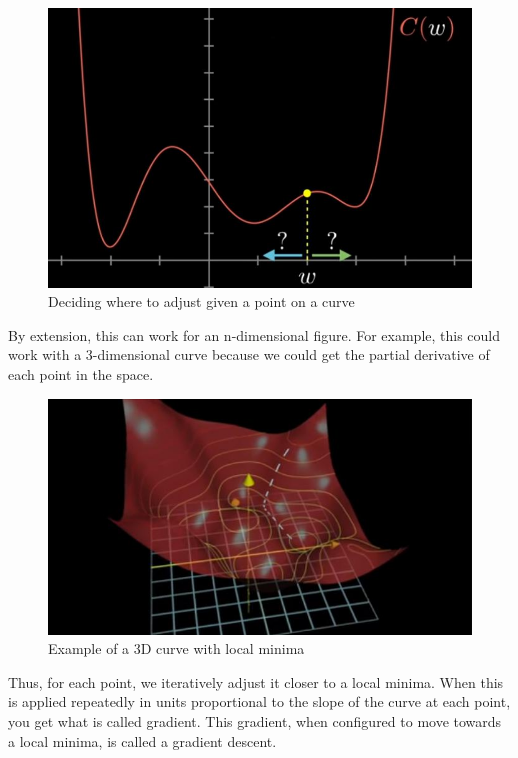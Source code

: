 \documentclass[a4paper, 11pt, english]{article}
\begin{document}
\begin{figure}[H]
  \centering
  \includegraphics[width=12cm]{images/gd2.jpg}
  \caption{Deciding where to adjust given a point on a curve\cite{3blue1brown_2017_2}}
  \label{fig:gd2}
\end{figure}

\par By extension, this can work for an n-dimensional figure. For example, this could work with a 3-dimensional curve because we could get the partial derivative of each point in the space.

\begin{figure}[H]
  \centering
  \includegraphics[width=12cm]{images/gd3.jpg}
  \caption{Example of a 3D curve with local minima\cite{3blue1brown_2017_2}}
  \label{fig:gd3}
\end{figure}

\par Thus, for each point, we iteratively adjust it closer to a local minima. When this is applied repeatedly in units proportional to the slope of the curve at each point, you get what is called gradient. This gradient, when configured to move towards a local minima, is called a gradient descent.
\end{document}
